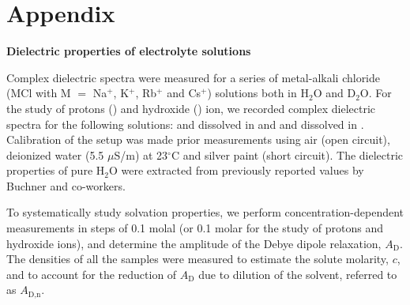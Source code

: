 
\chapter*{Appendix}
\vspace*{20pt}


\begin{center}
	\textcolor{SchoolColor}{\Titulosize\bfseries Dielectric properties of electrolyte solutions} \normalsize \\
	\vspace*{20pt}
\end{center}

\setcounter{table}{0}
\renewcommand\thetable{A.\arabic{table}}

Complex dielectric spectra were measured for a series of metal-alkali chloride (MCl with M $=$ Na$^+$, K$^+$, Rb$^+$ and Cs$^+$) solutions both in H$_2$O and D$_2$O. For the study of protons () and hydroxide () ion, we recorded complex dielectric spectra for the following solutions:  and  dissolved in  and  and  dissolved in . Calibration of the setup was made prior measurements using air (open circuit), deionized water (5.5 $\mu$S/m) at 23$^\circ$C and silver paint (short circuit). The dielectric properties of pure H$_2$O were extracted from previously reported values by Buchner and co-workers.\!\cite{Buchner1999}


To systematically study solvation properties, we perform concentration-dependent measurements in steps of 0.1 molal (or 0.1 molar for the study of protons and hydroxide ions), and determine the amplitude of the Debye dipole relaxation, $A_\text{D}$. The densities of all the samples were measured to estimate the solute molarity, $c$, and to account for the reduction of $A_\text{D}$ due to dilution of the solvent, referred to as $A_\text{D,n}$.


